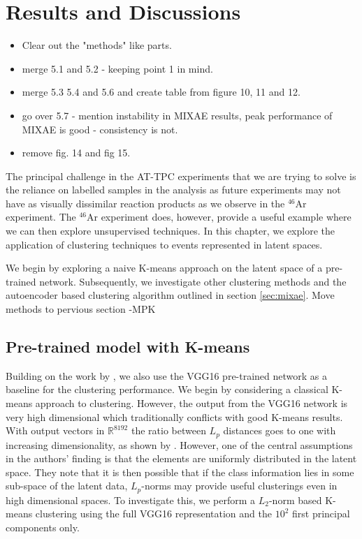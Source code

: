 \documentclass[review,number,sort&compress]{elsarticle}
\newcommand{\R}{\mathbb{R}}
\begin{document}
\section{Results and Discussions}\label{sec:results}
\begin{itemize}
\item Clear out the "methods" like parts.
\item merge 5.1 and 5.2 - keeping point 1 in mind.
\item merge 5.3 5.4 and 5.6 and create table from figure 10, 11 and 12. 
\item go over 5.7 - mention instability in MIXAE results, peak performance of MIXAE is good - consistency is not. 
\item remove fig. 14 and fig 15.
\end{itemize}

The principal challenge in the AT-TPC experiments that we are trying to solve is the reliance on labelled samples in the analysis as future experiments may not have as visually dissimilar reaction products  as we observe in the ${}^{46}$Ar experiment.  The  ${}^{46}$Ar experiment does, however, provide a useful example where we can then explore unsupervised techniques. In this chapter, we explore the application of clustering techniques to events represented in latent spaces. 

We begin by exploring a naive K-means approach on the latent space of a pre-trained network. Subsequently, we investigate other clustering methods and the autoencoder based clustering algorithm outlined in section \ref{sec:mixae}.
{\color{blue} Move methods to pervious section -MPK}
\subsection{Pre-trained model with K-means}
Building on the work by \citet{Kuchera2019}, we also use the VGG16 pre-trained network as a baseline for the clustering performance. We begin by considering a classical K-means approach to clustering. However, the output from the VGG16 network is very high dimensional which traditionally conflicts with good K-means results. With output vectors in $\R^{8192}$ the ratio between $L_p$ distances goes to one with increasing dimensionality, as shown by \citet{Aggarwal}. However, one of the central assumptions in the authors' finding is that the elements are uniformly distributed in the latent space. They note that it is then possible that if the class information lies in some sub-space of the latent data, $L_p$-norms may provide useful clusterings even in high dimensional spaces. To investigate this, we perform a $L_2$-norm based K-means clustering using the full VGG16 representation and the $10^2$ first principal components only. 
\end{document}
